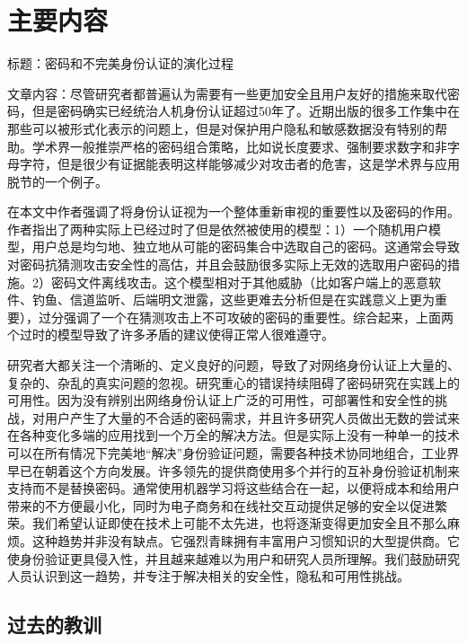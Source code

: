 
\section{主要内容}

标题：密码和不完美身份认证的演化过程

文章内容：尽管研究者都普遍认为需要有一些更加安全且用户友好的措施来取代密码，但是密码确实已经统治人机身份认证超过50年了。近期出版的很多工作集中在那些可以被形式化表示的问题上，但是对保护用户隐私和敏感数据没有特别的帮助。学术界一般推崇严格的密码组合策略，比如说长度要求、强制要求数字和非字母字符，但是很少有证据能表明这样能够减少对攻击者的危害，这是学术界与应用脱节的一个例子。

在本文中作者强调了将身份认证视为一个整体重新审视的重要性以及密码的作用。作者指出了两种实际上已经过时了但是依然被使用的模型：1）一个随机用户模型，用户总是均匀地、独立地从可能的密码集合中选取自己的密码。这通常会导致对密码抗猜测攻击安全性的高估，并且会鼓励很多实际上无效的选取用户密码的措施。2）密码文件离线攻击。这个模型相对于其他威胁（比如客户端上的恶意软件、钓鱼、信道监听、后端明文泄露，这些更难去分析但是在实践意义上更为重要），过分强调了一个在猜测攻击上不可攻破的密码的重要性。综合起来，上面两个过时的模型导致了许多矛盾的建议使得正常人很难遵守。

研究者大都关注一个清晰的、定义良好的问题，导致了对网络身份认证上大量的、复杂的、杂乱的真实问题的忽视。研究重心的错误持续阻碍了密码研究在实践上的可用性。因为没有辨别出网络身份认证上广泛的可用性，可部署性和安全性的挑战，对用户产生了大量的不合适的密码需求，并且许多研究人员做出无数的尝试来在各种变化多端的应用找到一个万全的解决方法。但是实际上没有一种单一的技术可以在所有情况下完美地“解决”身份验证问题，需要各种技术协同地组合，工业界早已在朝着这个方向发展。许多领先的提供商使用多个并行的互补身份验证机制来支持而不是替换密码。通常使用机器学习将这些结合在一起，以便将成本和给用户带来的不方便最小化，同时为电子商务和在线社交互动提供足够的安全以促进繁荣。我们希望认证即使在技术上可能不太先进，也将逐渐变得更加安全且不那么麻烦。这种趋势并非没有缺点。它强烈青睐拥有丰富用户习惯知识的大型提供商。它使身份验证更具侵入性，并且越来越难以为用户和研究人员所理解。我们鼓励研究人员认识到这一趋势，并专注于解决相关的安全性，隐私和可用性挑战。
\subsection{过去的教训}


